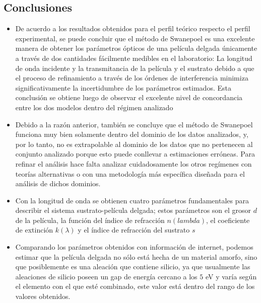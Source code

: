 \documentclass[article]{article}
\begin{document}
\begin{multicols}{2}
     \section{Conclusiones} 
        
        \begin{itemize}
            \item De acuerdo a los resultados obtenidos para el perfil teórico respecto el perfil experimental, se puede concluir que el método de Swanepoel es una excelente manera de obtener los parámetros ópticos de una película delgada únicamente a través de dos cantidades fácilmente medibles en el laboratorio: La longitud de onda incidente y la transmitancia de la película y el sustrato debido a que el proceso de refinamiento a través de los órdenes de interferencia minimiza significativamente la incertidumbre de los parámetros estimados. Esta conclusión se obtiene luego de observar el excelente nivel de concordancia entre los dos modelos dentro del régimen analizado
            
            \item Debido a la razón anterior, también se concluye que el método de Swanepoel funciona muy bien solamente dentro del dominio de los datos analizados, y, por lo tanto, no es extrapolable al dominio de los datos que no pertenecen al conjunto analizado porque esto puede conllevar a estimaciones erróneas. Para refinar el análisis hace falta analizar cuidadosamente los otros regímenes con teorías alternativas o con una metodología más específica diseñada para el análisis de dichos dominios.
            
            \item Con la longitud de onda se obtienen cuatro parámetros fundamentales para describir el sistema sustrato-película delgada; estos parámetros son el grosor $d$ de la película, la función del índice de refracción $n(lambda)$, el coeficiente de extinción $k(\lambda)$ y el índice de refracción del sustrato $s$
            
            \item Comparando los parámetros obtenidos con información de internet, podemos estimar que la película delgada no sólo está hecha de un material amorfo, sino que posiblemente es una aleación que contiene silicio, ya que usualmente las aleaciones de silicio poseen un gap de energía cercano a los $5$ eV y varía según el elemento con el que esté combinado, este valor está dentro del rango de los valores obtenidos.
            

\end{itemize}
\end{multicols}
\end{document}
